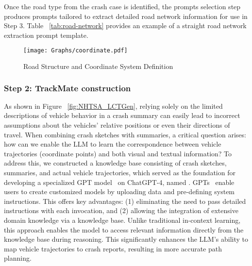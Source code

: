Once the road type from the crash case is identified, the prompts selection step produces prompts tailored to extract detailed road network information for use in Step 3. Table ~\ref{tab:road-network} provides an example of a straight road network extraction prompt template.

\begin{figure}[!t]
\setlength{\abovecaptionskip}{-0.5pt}
\setlength{\belowcaptionskip}{-2pt} 
  \centering
  \texttt{[image: Graphs/coordinate.pdf]}
  \caption{Road Structure and Coordinate System Definition}
  \label{fig:corrdinate}
\vspace{-5mm} 
\end{figure}

\subsubsection{Step 2: TrackMate construction}
As shown in Figure ~\ref{fig:NHTSA_LCTGen}, relying solely on the limited descriptions of vehicle behavior in a crash summary can easily lead to incorrect assumptions about the vehicles' relative positions or even their directions of travel. When combining crash sketches with summaries, a critical question arises: how can we enable the LLM to learn the correspondence between vehicle trajectories (coordinate points) and both visual and textual information? To address this, we constructed a knowledge base consisting of crash sketches, summaries, and actual vehicle trajectories, which served as the foundation for developing a specialized GPT model~\cite{GPTs} on ChatGPT-4, named {\tooltwo}. GPTs~\cite{GPTs} enable users to create customized models by uploading data and pre-defining system instructions. This offers key advantages: (1) eliminating the need to pass detailed instructions with each invocation, and (2) allowing the integration of extensive domain knowledge via a knowledge base. Unlike traditional in-context learning, this approach enables the model to access relevant information directly from the knowledge base during reasoning. This significantly enhances the LLM's ability to map vehicle trajectories to crash reports, resulting in more accurate path planning.

